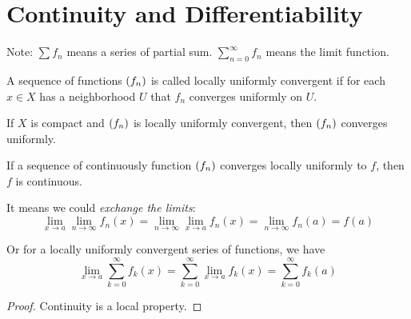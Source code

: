 
\section{Continuity and Differentiability}

Note: $\sum f_n$ means a series of partial sum. $\sum_{n=0}^\infty f_n$ means the limit function.

\begin{definition}\label{locally_uniformly_convergent}
    A sequence of functions $\sequence{f_n}$ is called locally uniformly convergent if for each $x \in X$ has a neighborhood $U$ that $f_n$ converges uniformly on $U$.
\end{definition}


\begin{theorem}
    If $X$ is compact and $\sequence{f_n}$ is locally uniformly convergent, then $\sequence{f_n}$ converges uniformly.
\end{theorem}

\begin{theorem}
    If a sequence of continuously function $\sequence{f_n}$ converges locally uniformly to $f$, then $f$ is continuous.
    
    It means we could \emph{exchange the limits}:
    \begin{equation}
        \lim_{x \rightarrow a} \lim_{n \rightarrow \infty} f_n(x) = \lim_{n \rightarrow\infty} \lim_{x \rightarrow a} f_n(x) = \lim_{n \rightarrow \infty}f_n(a) = f(a)
    \end{equation}
    
    Or for a locally uniformly convergent series of functions, we have
    \begin{equation}
        \lim_{x\rightarrow a} \sum_{k=0}^\infty f_k(x) = \sum_{k=0}^\infty \lim_{x \rightarrow a} f_k (x) = \sum_{k=0}^\infty f_k (a)
    \end{equation}
\end{theorem}
\begin{proof}
    Continuity is a local property.
\end{proof}

